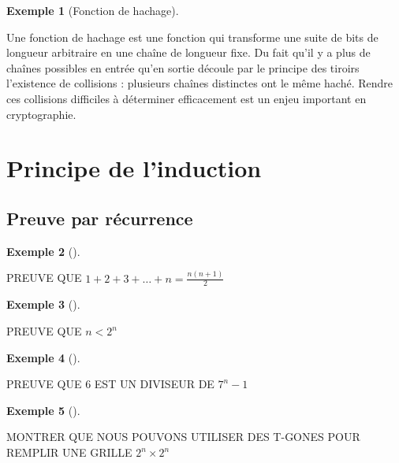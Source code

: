 \documentclass[
  letterpaper,
]{scrbook}
\theoremstyle{plain}
\theoremstyle{definition}
\theoremstyle{definition}
\newtheorem{example}{Exemple}[chapter]
\theoremstyle{remark}
\begin{document}
\begin{example}[Fonction de
hachage]\protect\hypertarget{exm-fonction-hachage}{}\label{exm-fonction-hachage}

Une fonction de hachage est une fonction qui transforme une suite de
bits de longueur arbitraire en une chaîne de longueur fixe. Du fait
qu'il y a plus de chaînes possibles en entrée qu'en sortie découle par
le principe des tiroirs l'existence de collisions : plusieurs chaînes
distinctes ont le même haché. Rendre ces collisions difficiles à
déterminer efficacement est un enjeu important en cryptographie.

\end{example}

\hypertarget{principe-de-linduction}{%
\section{Principe de l'induction}\label{principe-de-linduction}}

\hypertarget{preuve-par-ruxe9currence}{%
\subsection{Preuve par récurrence}\label{preuve-par-ruxe9currence}}

\begin{example}[]\protect\hypertarget{exm-somme-n-premiers-entiers}{}\label{exm-somme-n-premiers-entiers}

PREUVE QUE \(1+2+3+\ldots +n=\frac{n(n+1)}{2}\)

\end{example}

\begin{example}[]\protect\hypertarget{exm-n-plus-petit-2n}{}\label{exm-n-plus-petit-2n}

PREUVE QUE \(n<2^n\)

\end{example}

\begin{example}[]\protect\hypertarget{exm-6-divise-7n-1}{}\label{exm-6-divise-7n-1}

PREUVE QUE 6 EST UN DIVISEUR DE \(7^n-1\)

\end{example}

\begin{example}[]\protect\hypertarget{exm-space-filling-shapes}{}\label{exm-space-filling-shapes}

MONTRER QUE NOUS POUVONS UTILISER DES T-GONES POUR REMPLIR UNE GRILLE
\(2^n \times 2^n\)

\end{example}
\end{document}

